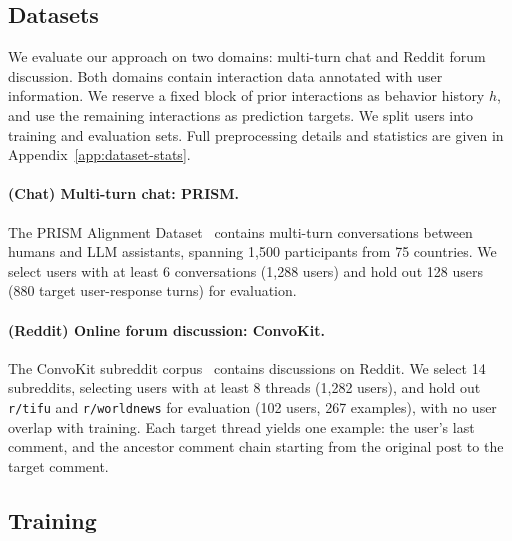 \documentclass{article} %
\begin{document}
\subsection{Datasets}
We evaluate our approach on two domains: multi-turn chat and Reddit forum discussion. Both domains contain interaction data annotated with user information. We reserve a fixed block of prior interactions as behavior history $h$, and use the remaining interactions as prediction targets. We split users into training and evaluation sets. Full preprocessing details and statistics are given in Appendix~\ref{app:dataset-stats}.


\paragraph{(Chat) Multi-turn chat: PRISM.}
The PRISM Alignment Dataset~\citep{kirk2024prism} contains multi-turn conversations between humans and LLM assistants, spanning 1,500 participants from 75 countries. We select users with at least 6 conversations (1,288 users) and hold out 128 users (880 target user-response turns) for evaluation. 

\paragraph{(Reddit) Online forum discussion: ConvoKit.}
The ConvoKit subreddit corpus~\citep{chang2020convokit} contains discussions on Reddit. We select 14 subreddits, selecting users with at least 8 threads (1,282 users), and hold out \texttt{r/tifu} and \texttt{r/worldnews} for evaluation (102 users, 267 examples), with no user overlap with training. Each target thread yields one example: the user's last comment, and the ancestor comment chain starting from the original post to the target comment.

\subsection{Training}
\end{document}
